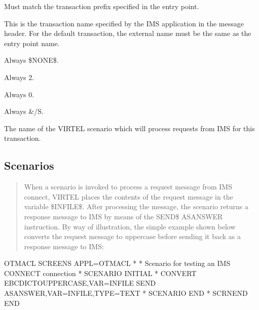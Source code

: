\documentclass[letterpaper,10pt,english]{sphinxmanual}
\begin{document}
\sphinxAtStartPar
{}
\begin{description}
\sphinxAtStartPar
Must match the transaction prefix specified in the entry point.

\sphinxAtStartPar
This is the transaction name specified by the IMS application in the
message header. For the default transaction, the external name must
be the same as the entry point name.

\sphinxAtStartPar
Always \$NONE\$.

\sphinxAtStartPar
Always 2.

\sphinxAtStartPar
Always 0.

\sphinxAtStartPar
Always \&/S.

\sphinxAtStartPar
The name of the VIRTEL scenario which will process requests from IMS
for this transaction.

\end{description}

\ignorespaces 

\subsection{Scenarios}
\label{\detokenize{connectivity_guide:scenarios}}\label{\detokenize{connectivity_guide:index-26}}\begin{quote}

\sphinxAtStartPar
When a scenario is invoked to process a request message from IMS connect, VIRTEL places the contents of the request message in the variable \$INFILE\$. After processing the message, the scenario  returns a response message to IMS by means of the SEND\$ AS\sphinxhyphen{}ANSWER instruction. By way of illustration, the simple example shown below converts the request message to uppercase before sending it back as a response message to IMS:
\end{quote}

\begin{sphinxVerbatim}[commandchars=\\\{\}]
OTMACL SCREENS APPL=OTMACL
*
* Scenario for testing an IMS CONNECT connection
*
SCENARIO INITIAL
*
CONVERT\PYGZdl{} EBCDIC\PYGZhy{}TO\PYGZhy{}UPPERCASE,VAR=\PYGZsq{}\PYGZdl{}INFILE\PYGZdl{}\PYGZsq{}
SEND\PYGZdl{} AS\PYGZhy{}ANSWER,VAR=\PYGZsq{}\PYGZdl{}INFILE\PYGZdl{}\PYGZsq{},TYPE=\PYGZsq{}TEXT\PYGZsq{}
*
SCENARIO END
*
SCRNEND
END
\end{sphinxVerbatim}
\end{document}
